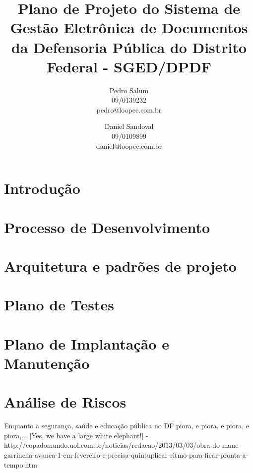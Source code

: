 \documentclass[12pt,a4paper]{report}
\title{Plano de Projeto do Sistema de Gestão Eletrônica de Documentos da Defensoria Pública do Distrito Federal - SGED/DPDF}
\author{Pedro Salum\\
	09/0139232\\
	pedro@loopec.com.br
	\and
	Daniel Sandoval\\
	09/0109899\\
	daniel@loopec.com.br}
\begin{document}
\maketitle
\tableofcontents

\chapter{Introdução}

\chapter{Processo de Desenvolvimento}


\chapter{Arquitetura e padrões de projeto}


\chapter{Plano de Testes}

\chapter{Plano de Implantação e Manutenção}

\chapter{Análise de Riscos}
Enquanto a segurança, saúde e educação pública no DF piora, e piora, e piora, e piora,... [Yes, we have a large white elephant!] - http://copadomundo.uol.com.br/noticias/redacao/2013/03/03/obra-do-mane-garrincha-avanca-1-em-fevereiro-e-precisa-quintuplicar-ritmo-para-ficar-pronta-a-tempo.htm
\end{document}
